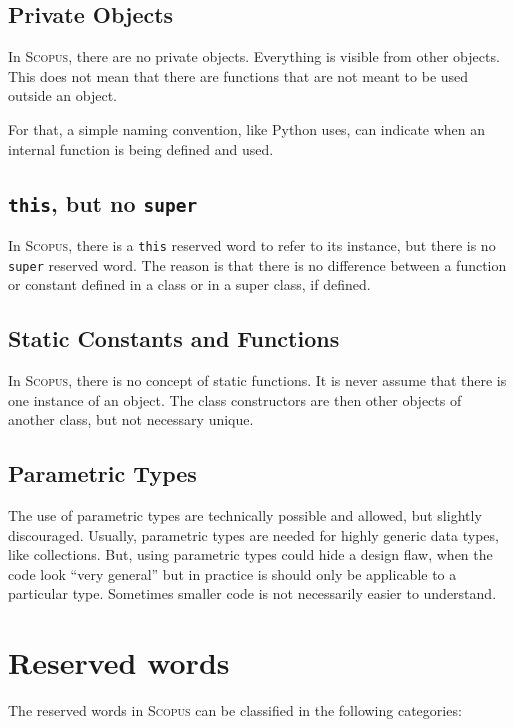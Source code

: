 \documentclass[12pt,a4paper]{article}
\newcommand{\srccode}[1]{\texttt{{#1}}}
\newcommand{\reservedWord}[1]{{\color{blue}\srccode{#1}}\xspace}
\newcommand{\sthis}{\reservedWord{this}}
\newcommand{\Scopus}{\textsc{Scopus}\xspace}
\begin{document}
    \subsection{Private Objects}

    In \Scopus, there are no private objects.
    Everything is visible from other objects.
    This does not mean that there are functions that are not meant to be used outside an object.

    For that, a simple naming convention, like Python uses, can indicate when an internal function is being defined and used.

    \subsection{\sthis, but no \srccode{super}}

    In \Scopus, there is a \sthis reserved word to refer to its instance, but there is no \srccode{super} reserved word.
    The reason is that there is no difference between a function or constant defined in a class or in a super class, if defined.

    \subsection{Static Constants and Functions}

    In \Scopus, there is no concept of static functions.
    It is never assume that there is one instance of an object.
    The class constructors are then other objects of another class, but not necessary unique.

    \subsection{Parametric Types}

    The use of parametric types are technically possible and allowed, but slightly discouraged.
    Usually, parametric types are needed for highly generic data types, like collections.
    But, using parametric types could hide a design flaw, when the code look ``very general'' but in practice is should only be applicable to a particular type.
    Sometimes smaller code is not necessarily easier to understand.


    \section{Reserved words}

    The reserved words in \Scopus can be classified in the following categories:
\end{document}
